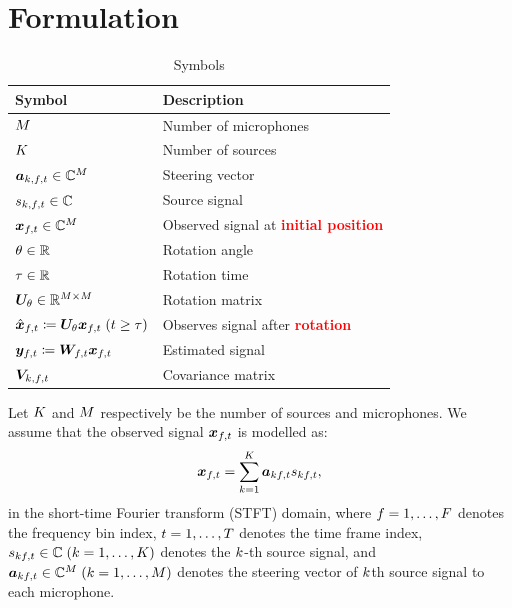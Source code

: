 \documentclass[sip,biber]{now-journal}
\begin{document}
\section{Formulation}
\begin{table}[t]
  \centering
  \caption{Symbols}
  \begin{tabular}{ll}
    \toprule
      Symbol & Description \\
    \midrule
      $M$                                                                              & Number of microphones \\
      $K$                                                                              & Number of sources \\
      $\steer _{\src,\ft} \in \C ^{\Mic}$                                                 & Steering vector \\
      $\sig _{\src,\ft} \in \C$                                                           & Source signal \\
      $\Obs _{\ft} \in \C^{\Mic}$                                                         & Observed signal at \textcolor{red}{\textbf{initial position}} \\
      $\theta \in \mathbb{R}$                                                                    & Rotation angle \\
      $\tau \in \mathbb{R}$                                                                    & Rotation time \\
      $\bm{U} _{\theta} \in \mathbb{R} ^{M \times M}$                                     & Rotation matrix \\
      $\rotObs _{\ft} \coloneqq \rotMat _{\rotDeg} \Obs _{\ft} \; (\tframe \geq \rotFra)$ & Observes signal after \textcolor{red}{\textbf{rotation}} \\
      $\Est _{\ft} \coloneqq \Demix _{\ft} \Obs _{\ft}$                                   & Estimated signal \\
      $\cov _{\src,\ft}$                                                                  & Covariance matrix \\
    \bottomrule
  \end{tabular}
\end{table}

Let $K$ and $M$ respectively be the number of sources and microphones.
We assume that the observed signal $\Obs _{\ft}$ is modelled as:
\begin{equation}
  \Obs _{\ft} = \sum _{\src=1} ^{\Src} \steer _{\src\ft} \sig _{\src\ft},
\end{equation}
in the short-time Fourier transform (STFT) domain,
where $f = 1, \dots, F$ denotes the frequency bin index,
$t = 1, \dots, T$ denotes the time frame index,
$\sig _{\src\ft} \in \C\; (\src = 1, \dots, \Src)$ denotes the $k$-th source signal, and
$\steer _{\src\ft} \in \C ^{\Mic}\; (\src = 1, \dots, \Mic)$ denotes the steering vector of $k$th source signal to each microphone.
\end{document}

